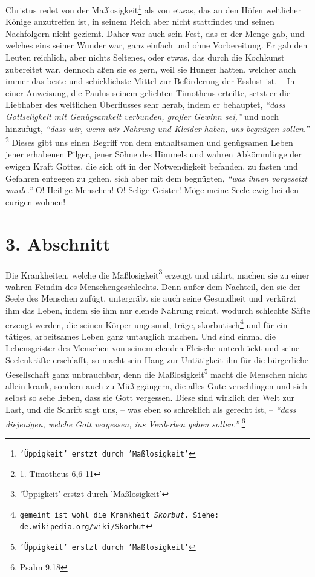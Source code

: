\medskip

Christus redet von der Maßlosigkeit\footnote{\texttt{'Üppigkeit' erstzt durch 'Maßlosigkeit'}} als von 
etwas, das an den Höfen weltlicher
Könige anzutreffen ist, in seinem Reich aber nicht stattfindet und seinen
Nachfolgern nicht geziemt. Daher war auch sein Fest, das er der Menge gab, und
welches eins seiner Wunder war, ganz einfach und ohne Vorbereitung. Er gab den
Leuten reichlich, aber nichts Seltenes, oder etwas, das durch die Kochkunst
zubereitet war, dennoch aßen sie es gern, weil sie Hunger hatten, welcher auch
immer das beste und schicklichste Mittel zur Beförderung der Esslust ist. -- In
einer Anweisung, die Paulus seinem geliebten Timotheus erteilte, setzt er die
Liebhaber des weltlichen Überflusses sehr herab, indem er behauptet,
\textit{"`dass Gottseligkeit mit Genügsamkeit verbunden, großer Gewinn sei,"'} und noch 
hinzufügt, \textit{"`dass wir, wenn wir Nahrung und Kleider haben, uns begnügen
sollen."'}
\footnote{1. Timotheus 6,6-11}
Dieses gibt uns einen Begriff von dem
enthaltsamen und genügsamen Leben jener erhabenen Pilger, jener 
Söhne des Himmels und wahren Abkömmlinge der ewigen Kraft 
Gottes, die sich oft in der
Notwendigkeit befanden, zu fasten und Gefahren entgegen zu gehen, sich aber
mit dem begnügten, \textit{"`was ihnen vorgesetzt wurde."'} O! Heilige Menschen! O!
Selige Geister! Möge meine Seele ewig bei den eurigen wohnen!

\section{3. Abschnitt} \label{kap14_ab3}

Die Krankheiten, welche die Maßlosigkeit\footnote{'Üppigkeit' erstzt durch 'Maßlosigkeit'} erzeugt 
und nährt, machen sie zu einer
wahren Feindin des Menschengeschlechts. Denn außer dem Nachteil, den sie der
Seele des Menschen zufügt, untergräbt sie auch seine Gesundheit und verkürzt ihm
das Leben, indem sie ihm nur elende Nahrung reicht, wodurch schlechte Säfte
erzeugt werden, die seinen Körper ungesund, träge, skorbutisch\footnote{\texttt{gemeint ist
wohl die Krankheit \textit{Skorbut}. Siehe: de.wikipedia.org/wiki/Skorbut}} und für ein tätiges,
arbeitsames Leben ganz untauglich machen. Und sind einmal die Lebensgeister des
Menschen von seinem elenden Fleische unterdrückt und seine Seelenkräfte
erschlafft, so macht sein Hang zur Untätigkeit ihn für die bürgerliche Gesellschaft
 ganz unbrauchbar, 
denn die Maßlosigkeit\footnote{\texttt{'Üppigkeit' erstzt durch 'Maßlosigkeit'}} 
macht die Menschen nicht
allein krank, sondern auch zu Müßiggängern, die alles Gute verschlingen und
sich selbst so sehe lieben, dass sie Gott vergessen. Diese sind wirklich der Welt
zur Last, und die Schrift sagt uns, -- was eben so schreklich 
als gerecht ist,
-- \textit{"`dass diejenigen, welche Gott vergessen, ins Verderben gehen
sollen."'}
\footnote{Psalm 9,18}

